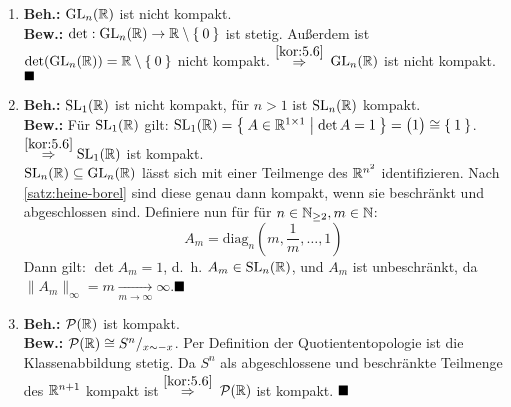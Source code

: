 \begin{solution}[\ref{ub3:aufg1}]
    \begin{enumerate}[label=(\alph*)]
        \item \textbf{Beh.:} $\mathrm{GL}_n(\mathbb{R})$ ist nicht kompakt.\\
            \textbf{Bew.:} $\det: \mathrm{GL}_n(\mathbb{R}) \rightarrow \mathbb{R} \setminus \Set{0}$
                ist stetig. Außerdem ist 
                $\det(\mathrm{GL}_n(\mathbb{R})) = \mathbb{R} \setminus \Set{0}$ nicht 
                kompakt. $\overset{\ref{kor:5.6}}{\Rightarrow}$ 
                $\mathrm{GL}_n(\mathbb{R})$ ist nicht kompakt. $\qed$
        \item \textbf{Beh.:} $\mathrm{SL}_1(\mathbb{R})$ ist nicht kompakt, für $n > 1$ ist $\mathrm{SL}_n(\mathbb{R})$ kompakt.\\
            \textbf{Bew.:} Für $\mathrm{SL}_1(\mathbb{R})$ gilt:
                $\mathrm{SL}_1(\mathbb{R}) = \Set{A \in \ensuremath{\mathbb{R}}^{1 \times 1} | \det A = 1} = \begin{pmatrix}1\end{pmatrix} \cong \Set{1}$.
                $\overset{\ref{kor:5.6}}{\Rightarrow} \mathrm{SL}_1(\mathbb{R})$ ist
                kompakt.\\

                $\mathrm{SL}_n(\mathbb{R}) \subseteq \mathrm{GL}_n(\mathbb{R})$ lässt sich mit einer
                Teilmenge des $\mathbb{R}^{n^2}$ identifizieren. Nach \cref{satz:heine-borel}
                sind diese genau dann kompakt, wenn sie beschränkt und 
                abgeschlossen sind. Definiere nun für für $n \in \mathbb{N}_{\geq 2}, m \in \mathbb{N}$:
                \[A_m = \text{diag}_n(m, \frac{1}{m}, \dots, 1)\]
                Dann gilt: $\det A_m = 1$, d.~h. $A_m \in \mathrm{SL}_n(\mathbb{R})$,
                und $A_m$ ist unbeschränkt, da $\|A_m\|_\infty =m \xrightarrow[m \rightarrow \infty]{} \infty$.$\qed$
        \item \textbf{Beh.:} $\mathcal{P}(\mathbb{R})$ ist kompakt.\\
            \textbf{Bew.:} $\mathcal{P}(\mathbb{R}) \cong S^n/_{x \sim -x}$.
                Per Definition der Quotiententopologie ist die Klassenabbildung stetig.
                Da $S^n$ als abgeschlossene und beschränkte Teilmenge
                des $\mathbb{R}^{n+1}$ kompakt ist $\overset{\ref{kor:5.6}}{\Rightarrow}$
                $\mathcal{P}(\mathbb{R})$ ist kompakt. $\qed$
    \end{enumerate}
\end{solution}

